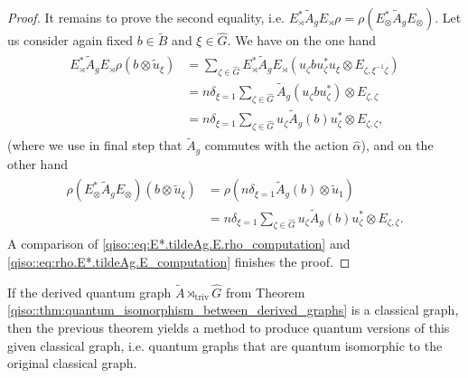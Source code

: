 \documentclass{amsart}
\theoremstyle{definition}
\theoremstyle{definition}
\begin{document}
\begin{proof}
    It remains to prove the second equality, i.e. $E_\rtimes^\ast \tilde{A}_g E_\rtimes \rho = \rho (E_\otimes^\ast \tilde{A}_g E_\otimes)$. Let us consider again fixed $b \in \tilde{B}$ and $\xi \in \hat{G}$. We have on the one hand
    \begin{align}
        \label{qiso::eq:E*.tildeAg.E.rho_computation}
        \begin{aligned}
        E_\rtimes^\ast \tilde{A}_g E_\rtimes \rho(b \otimes \tilde{u}_\xi)
            &= \sum_{\zeta \in \hat{G}} E_\rtimes^\ast \tilde{A}_g E_\rtimes (u_\zeta b u_\zeta^\ast u_\xi \otimes E_{\zeta, \xi^{-1} \zeta}) \\
            &= n \delta_{\xi = 1} \sum_{\zeta \in \hat{G}} \tilde{A}_g(u_\zeta b u_\zeta^\ast) \otimes E_{\zeta, \zeta} \\
            &= n \delta_{\xi = 1} \sum_{\zeta \in \hat{G}} u_\zeta \tilde{A}_g(b) u_\zeta^\ast \otimes E_{\zeta, \zeta},
        \end{aligned}
    \end{align}
    (where we use in final step that $\tilde{A}_g$ commutes with the action $\hat{\alpha}$),
    and on the other hand
    \begin{align}
        \label{qiso::eq:rho.E*.tildeAg.E_computation}
        \begin{aligned}
        \rho (E_\otimes^\ast \tilde{A}_g E_\otimes)(b \otimes \tilde{u}_\xi)
            &= \rho \left( n \delta_{\xi = 1} \tilde{A}_g(b) \otimes \tilde{u}_1 \right) \\
            &= n \delta_{\xi = 1} \sum_{\zeta \in \hat{G}} u_\zeta \tilde{A}_g(b) u_\zeta^\ast \otimes E_{\zeta, \zeta}.
        \end{aligned}
    \end{align}
    A comparison of \eqref{qiso::eq:E*.tildeAg.E.rho_computation} and \eqref{qiso::eq:rho.E*.tildeAg.E_computation} finishes the proof.
\end{proof}

If the derived quantum graph $\tilde{A} \rtimes_{\mathrm{triv}} \hat{G}$ from Theorem \ref{qiso::thm:quantum_isomorphism_between_derived_graphs} is a classical graph, then the previous theorem yields a method to produce quantum versions of this given classical graph, i.e. quantum graphs that are quantum isomorphic to the original classical graph.
\end{document}
